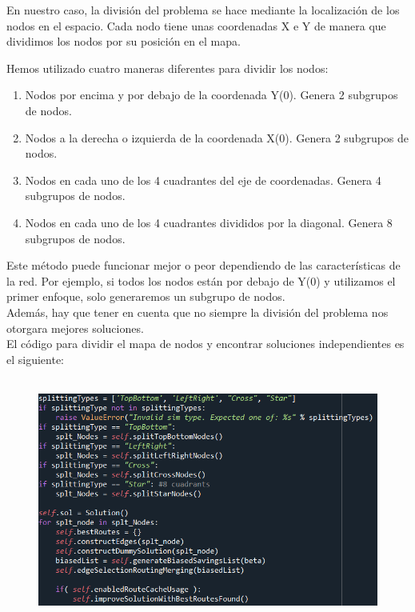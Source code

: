 \documentclass[11pt]{article} %
\begin{document}
\begin{enumerate}
En nuestro caso, la división del problema se hace mediante la localización de los nodos en el espacio. Cada nodo tiene unas coordenadas X e Y de manera que dividimos los nodos por su posición en el mapa.\\

\clearpage

Hemos utilizado cuatro maneras diferentes para dividir los nodos:
 \begin{enumerate}
\item Nodos por encima y por debajo de la coordenada Y(0). Genera 2 subgrupos de nodos.
\item Nodos a la derecha o izquierda de la coordenada X(0). Genera 2 subgrupos de nodos.
\item Nodos en cada uno de los 4 cuadrantes del eje de coordenadas. Genera 4 subgrupos de nodos.
\item Nodos en cada uno de los 4 cuadrantes divididos por la diagonal. Genera 8 subgrupos de nodos.
\end{enumerate}

Este método puede funcionar mejor o peor dependiendo de las características de la red. Por ejemplo, si todos los nodos están por debajo de Y(0) y utilizamos el primer enfoque, solo generaremos un subgrupo de nodos.\\
Además, hay que tener en cuenta que no siempre la división del problema nos otorgara mejores soluciones.\\

El código para dividir el mapa de nodos y encontrar soluciones independientes es el siguiente:

\begin{figure}[h]
\centering
\includegraphics[width=0.8\linewidth, height=8cm]{splittingCode.png} 
\label{fig:subim1}
\end{figure}


\end{enumerate}
\end{document}

